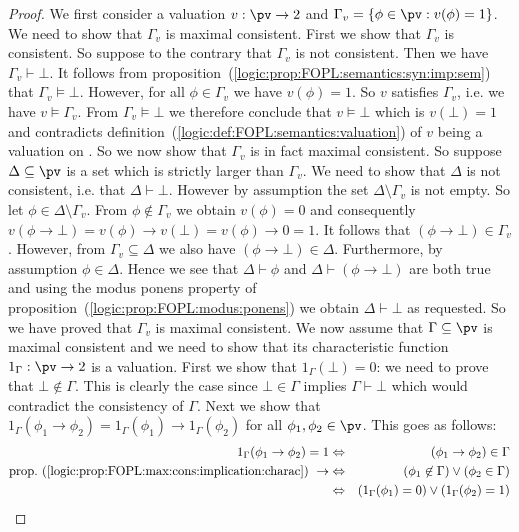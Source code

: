 \begin{proof}
We first consider a valuation $v:\pv\to 2$ and
$\Gamma_{v}=\{\phi\in\pv:v(\phi)=1\}$. We need to show that
$\Gamma_{v}$ is maximal consistent. First we show that $\Gamma_{v}$
is consistent. So suppose to the contrary that $\Gamma_{v}$ is not
consistent. Then we have $\Gamma_{v}\vdash\bot$. It follows from
proposition~(\ref{logic:prop:FOPL:semantics:syn:imp:sem}) that
$\Gamma_{v}\vDash\bot$. However, for all $\phi\in\Gamma_{v}$ we have
$v(\phi)=1$. So $v$ satisfies $\Gamma_{v}$, i.e. we have
$v\vDash\Gamma_{v}$. From $\Gamma_{v}\vDash\bot$ we therefore
conclude that $v\vDash\bot$ which is $v(\bot)=1$ and contradicts
definition~(\ref{logic:def:FOPL:semantics:valuation}) of $v$ being a
valuation on \pv. So we now show that $\Gamma_{v}$ is in fact
maximal consistent. So suppose $\Delta\subseteq\pv$ is a set which
is strictly larger than $\Gamma_{v}$. We need to show that $\Delta$
is not consistent, i.e. that $\Delta\vdash\bot$. However by
assumption the set $\Delta\setminus\Gamma_{v}$ is not empty. So let
$\phi\in\Delta\setminus\Gamma_{v}$. From $\phi\not\in\Gamma_{v}$ we
obtain $v(\phi)=0$ and consequently $v(\phi\to\bot)=v(\phi)\to
v(\bot)=v(\phi)\to 0=1$. It follows that
$(\phi\to\bot)\in\Gamma_{v}$. However, from
$\Gamma_{v}\subseteq\Delta$ we also have $(\phi\to\bot)\in\Delta$.
Furthermore, by assumption $\phi\in\Delta$. Hence we see that
$\Delta\vdash\phi$ and $\Delta\vdash(\phi\to\bot)$ are both true and
using the modus ponens property of
proposition~(\ref{logic:prop:FOPL:modus:ponens}) we obtain
$\Delta\vdash\bot$ as requested. So we have proved that $\Gamma_{v}$
is maximal consistent. We now assume that $\Gamma\subseteq\pv$ is
maximal consistent and we need to show that its characteristic
function $1_{\Gamma}:\pv\to 2$ is a valuation. First we show that
$1_{\Gamma}(\bot)=0$: we need to prove that $\bot\not\in\Gamma$.
This is clearly the case since $\bot\in\Gamma$ implies
$\Gamma\vdash\bot$ which would contradict the consistency of
$\Gamma$. Next we show that
$1_{\Gamma}(\phi_{1}\to\phi_{2})=1_{\Gamma}(\phi_{1})\to
1_{\Gamma}(\phi_{2})$ for all $\phi_{1},\phi_{2}\in\pv$. This goes
as follows:
    \begin{eqnarray*}
    1_{\Gamma}(\phi_{1}\to\phi_{2})=1&\Leftrightarrow&(\phi_{1}\to\phi_{2})\in\Gamma\\
    \mbox{prop.~(\ref{logic:prop:FOPL:max:cons:implication:charac})}
    \ \rightarrow&\Leftrightarrow&(\phi_{1}\not\in\Gamma)\lor(\phi_{2}\in\Gamma)\\
    &\Leftrightarrow&(1_{\Gamma}(\phi_{1})=0)\lor(1_{\Gamma}(\phi_{2})=1)\\

\end{eqnarray*}
\end{proof}
